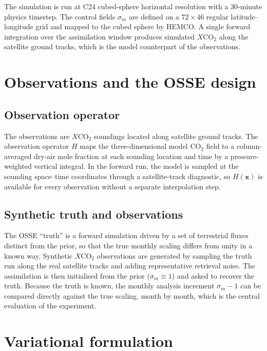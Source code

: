 \documentclass[12pt]{article}
\newcommand{\bm}[1]{\mathbf{#1}}
\newcommand{\xco}{X\mathrm{CO}_2}
\newcommand{\co}{\mathrm{CO}_2}
\begin{document}
The simulation is run at C24 cubed-sphere horizontal resolution with a
$30$-minute physics timestep. The control fields $\sigma_m$ are defined on a
$72\times46$ regular latitude--longitude grid and mapped to the cubed sphere by
HEMCO. A single forward integration over the assimilation window produces
simulated $\xco$ along the satellite ground tracks, which is the model
counterpart of the observations.

\section{Observations and the OSSE design}

\subsection{Observation operator}

The observations are $\xco$ soundings located along satellite ground tracks. The
observation operator $H$ maps the three-dimensional model $\co$ field to a
column-averaged dry-air mole fraction at each sounding location and time by a
pressure-weighted vertical integral. In the forward run, the model is sampled at
the sounding space--time coordinates through a satellite-track diagnostic, so
$H(\bm{x})$ is available for every observation without a separate interpolation
step.

\subsection{Synthetic truth and observations}

The OSSE ``truth'' is a forward simulation driven by a set of terrestrial fluxes
distinct from the prior, so that the true monthly scaling differs from unity in a
known way. Synthetic $\xco$ observations are generated by sampling the truth run
along the real satellite tracks and adding representative retrieval noise. The
assimilation is then initialised from the prior ($\sigma_m \equiv 1$) and asked
to recover the truth. Because the truth is known, the monthly analysis increment
$\sigma_m - 1$ can be compared directly against the true scaling, month by month,
which is the central evaluation of the experiment.

\section{Variational formulation}
\end{document}
